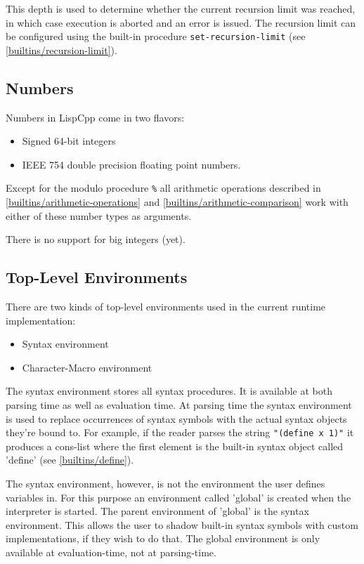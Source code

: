 \documentclass[a4paper]{scrartcl}
\begin{document}
	This depth is used to determine whether the current recursion limit was reached, in which case execution is aborted and an error is issued. The recursion limit can be configured using the built-in procedure \lstinline|set-recursion-limit| (see \ref{builtins/recursion-limit}).

\subsection{Numbers}
\label{numbers}
	Numbers in LispCpp come in two flavors:
	\begin{itemize}
		\item Signed 64-bit integers
		\item IEEE 754 double precision floating point numbers.
	\end{itemize}

	Except for the modulo procedure \lstinline|%| all arithmetic operations described in \ref{builtins/arithmetic-operations} and \ref{builtins/arithmetic-comparison} work with either of these number types as arguments.

	There is no support for big integers (yet).

\subsection{Top-Level Environments}
\label{env}
	There are two kinds of top-level environments used in the current runtime implementation:
	\begin{itemize}
		\item Syntax environment
		\item Character-Macro environment
	\end{itemize}

	The syntax environment stores all syntax procedures. It is available at both parsing time as well as evaluation time. At parsing time the syntax environment is used to replace occurrences of syntax symbols with the actual syntax objects they're bound to. For example, if the reader parses the string \lstinline|"(define x 1)"| it produces a cons-list where the first element is the built-in syntax object called 'define' (see \ref{builtins/define}).

	The syntax environment, however, is not the environment the user defines variables in. For this purpose an environment called 'global' is created when the interpreter is started. The parent environment of 'global' is the syntax environment. This allows the user to shadow built-in syntax symbols with custom implementations, if they wish to do that. The global environment is only available at evaluation-time, not at parsing-time.
\end{document}
